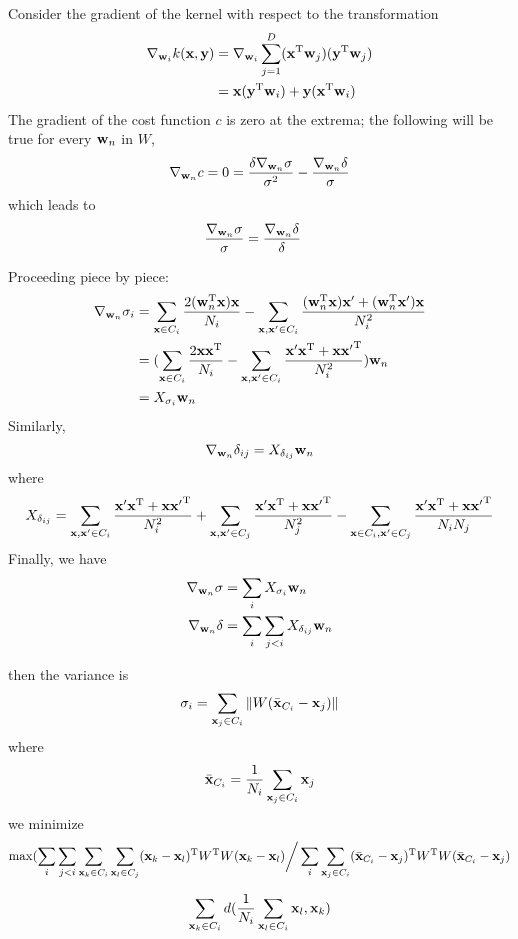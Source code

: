 \documentclass{article}
\newcommand{\bx}{{\bf x}}
\newcommand{\by}{{\bf y}}
\newcommand{\bw}{{\bf w}}
\newcommand{\bxp}{\bx^{\prime}}
\begin{document}
Consider the gradient of the kernel with respect to the transformation
\begin{align*}
\nabla_{\bw_i} k(\bx, \by)
  &=  \nabla_{\bw_i} \sum_{j=1}^D (\bx^{\rm T} \bw_j) (\by^{\rm T}
      \bw_j) \\
  &=  \bx (\by^{\rm T} \bw_i) + \by (\bx^{\rm T} \bw_i)
\end{align*}
The gradient of the cost function $c$ is zero at the extrema; the
following will be true for every $\bw_n$ in $W$,
\[
\nabla_{\bw_n} c = 0 =
  \frac{\delta \nabla_{\bw_n} \sigma}{\sigma^2} -
  \frac{\nabla_{\bw_n} \delta}{\sigma}
\]
which leads to
\begin{align*}
  \frac{\nabla_{\bw_n} \sigma}{\sigma} &=
  \frac{\nabla_{\bw_n} \delta}{\delta}
\end{align*}

Proceeding piece by piece:
\begin{align*}
\nabla_{\bw_n} \sigma_i &=
  \sum_{\bx \in C_i} \frac{2 (\bw_n^{\rm T} \bx) \bx}{N_i} -
  \sum_{\bx, \bxp \in C_i}
    \frac{(\bw_n^{\rm T} \bx) \bxp + (\bw_n^{\rm T} \bxp) \bx}{N_i^2}
    \\
&=
  (\sum_{\bx \in C_i} \frac{2 \bx \bx^{\rm T}}{N_i} -
  \sum_{\bx, \bxp \in C_i}
    \frac{\bxp \bx^{\rm T} + \bx {\bxp}^{\rm T}}{N_i^2})
  \bw_n \\
&= X_{\sigma_i} \bw_n
\end{align*}
Similarly,
\[
\nabla_{\bw_n} \delta_{ij} = X_{\delta_{ij}} \bw_n
\]
where
\[
X_{\delta_{ij}} =
  \sum_{\bx, \bxp \in C_i}
    \frac{\bxp \bx^{\rm T} + \bx {\bxp}^{\rm T}}{N_i^2} +
  \sum_{\bx, \bxp \in C_j}
    \frac{\bxp \bx^{\rm T} + \bx {\bxp}^{\rm T}}{N_j^2} -
  \sum_{\bx \in C_i, \bxp \in C_j}
    \frac{\bxp \bx^{\rm T} + \bx {\bxp}^{\rm T}}{N_i N_j}
\]
Finally, we have
\begin{align*}
\nabla_{\bw_n} \sigma &= \sum_i X_{\sigma_i} \bw_n \\
\nabla_{\bw_n} \delta &= \sum_i \sum_{j<i} X_{\delta_{ij}} \bw_n
\end{align*}


then the variance is
\[
\sigma_i = \sum_{\bx_j \in C_i} \| W ( \bar{\bx}_{C_i} - \bx_j ) \|
\]
where
\[
\bar{\bx}_{C_i} = \frac{1}{N_i} \sum_{\bx_j \in C_i} \bx_j
\]
we minimize
\[
\max ( \sum_i \sum_{j < i} \sum_{\bx_k \in C_i} \sum_{\bx_l \in C_j}
(\bx_k - \bx_l)^{\rm T} W^{\rm T} W (\bx_k - \bx_l)
\bigg / \sum_i \sum_{\bx_j \in C_i}
(\bar{\bx}_{C_i} - \bx_j)^{\rm T} W^{\rm T} W (\bar{\bx}_{C_i} - \bx_j)
\]

\[
\sum_{\bx_k \in C_i} d(\frac{1}{N_i} \sum_{\bx_l \in C_i} \bx_l, \bx_k)
\]
\end{document}
